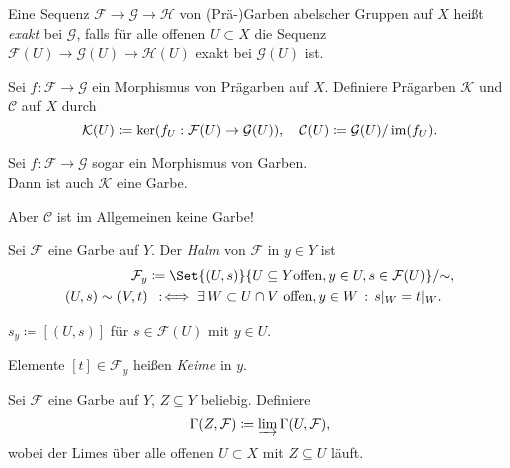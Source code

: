 \documentclass{cheat-sheet}
\newcommand{\Fais}{\mathcal{F}} %
\newcommand{\Garb}{\mathcal{G}} %
\newcommand{\Harb}{\mathcal{H}} %
\begin{document}


\begin{defn}
  Eine Sequenz $\Fais \to \Garb \to \Harb$ von (Prä-)Garben abelscher Gruppen auf $X$ heißt \emph{exakt} bei $\Garb$, falls für alle offenen $U \subset X$ die Sequenz $\Fais(U) \to \Garb(U) \to \Harb(U)$ exakt bei $\Garb(U)$ ist.
\end{defn}

\begin{defn}
  Sei $f : \Fais \to \Garb$ ein Morphismus von Prägarben auf $X$. Definiere Prägarben $\mathcal{K}$ und $\mathcal{C}$ auf $X$ durch
  \[
    \mathcal{K}(U) \coloneqq \ker (f_U : \Fais(U) \to \Garb(U)), \quad
    \mathcal{C}(U) \coloneqq \Garb(U) / \im (f_U).
  \]
\end{defn}

\begin{prop}
  Sei $f : \Fais \to \Garb$ sogar ein Morphismus von Garben. \\
  Dann ist auch $\mathcal{K}$ eine Garbe.
\end{prop}

\begin{acht}
  Aber $\mathcal{C}$ ist im Allgemeinen keine Garbe!
\end{acht}


\begin{defn}
  Sei $\Fais$ eine Garbe auf $Y$. Der \emph{Halm} von $\Fais$ in $y \in Y$ ist
  \begin{align*}
    \Fais_y & \coloneqq \Set{(U, s)}{U \subseteq Y \text{offen}, y \in U, s \in \Fais(U)} / {\sim}, \\
    (U, s) \sim (V, t) & \coloniff \ex{W \subset U \cap V \text{ offen}, y \in W} s|_W = t|_W.
  \end{align*}
\end{defn}

\begin{nota}
  $s_y \coloneqq [(U, s)]$ für $s \in \Fais(U)$ mit $y \in U$.
\end{nota}

\begin{sprech}
  Elemente $[t] \in \Fais_y$ heißen \emph{Keime} in $y$.
\end{sprech}

\begin{defn}
  Sei $\Fais$ eine Garbe auf $Y$, $Z \subseteq Y$ beliebig. Definiere
  \[ \Gamma(Z, \Fais) \coloneqq \varinjlim \Gamma(U, \Fais), \]
  wobei der Limes über alle offenen $U \subset X$ mit $Z \subseteq U$ läuft.
\end{defn}
\end{document}
